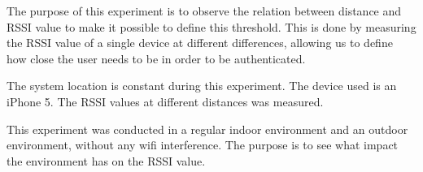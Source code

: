The purpose of this experiment is to observe the relation between distance and RSSI value to make it possible to  define  this threshold. This is done by measuring the RSSI value of a single device at different differences, allowing us to define how close the user needs to be in order to be authenticated.

The system location is constant during this experiment. The device used is an iPhone 5. The RSSI values at different distances was measured. 

This experiment was conducted in a regular indoor environment and an outdoor environment, without any wifi interference. The purpose is to see what impact the environment has on the RSSI value.


